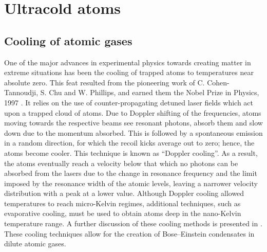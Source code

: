 \section{Ultracold atoms}\label{sec:coldatoms}
\subsection{Cooling of atomic gases}\label{sub:cooling}
One of the major advances in experimental physics towards creating matter in extreme situations has been the cooling of trapped atoms to temperatures near absolute zero. This feat resulted from the pioneering work of C. Cohen-Tannoudji, S. Chu and W.
Phillips, and earned them the Nobel Prize in Physics, 1997 \cite{AO:Chu_revmod_1998,AO:Cohen_revmod_1998,AO:Phillips_revmod_1998}.
It relies on the use of counter-propagating detuned laser fields which act upon a trapped cloud of atoms. Due to Doppler shifting of the frequencies, atoms moving towards the respective beams see resonant photons, absorb them and slow down due to the momentum absorbed. This is followed by a spontaneous emission in a random direction, for which the recoil kicks average out to zero; hence, the atoms become cooler. This technique is known as ``Doppler cooling''. As a result, the atoms eventually reach a velocity below that which no photons can be absorbed from the lasers due to the change in resonance frequency and the limit imposed by the resonance width of the atomic levels, leaving a narrower velocity distribution with a peak at a lower value. Although Doppler cooling allowed temperatures to reach micro-Kelvin regimes, additional techniques, such as evaporative cooling, must be used to obtain atoms deep in the nano-Kelvin temperature range. A further discussion of these cooling methods is presented in \cite{BK:Foot_2005,BK:Metcalf_1999}. These cooling techniques allow for the creation of Bose--Einstein condensates in dilute atomic gases.

